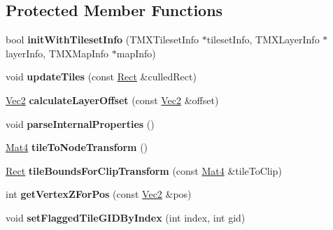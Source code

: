 \subsection*{Protected Member Functions}
\begin{DoxyCompactItemize}
\item 
\mbox{\label{classexperimental_1_1TMXLayer_abc5373b13dff0e9f01697f46783eaff8}} 
bool {\bfseries init\+With\+Tileset\+Info} (T\+M\+X\+Tileset\+Info $\ast$tileset\+Info, T\+M\+X\+Layer\+Info $\ast$layer\+Info, T\+M\+X\+Map\+Info $\ast$map\+Info)
\item 
\mbox{\label{classexperimental_1_1TMXLayer_a905d1bd7651df39c2b80a5aaf5a79b16}} 
void {\bfseries update\+Tiles} (const \hyperlink{classRect}{Rect} \&culled\+Rect)
\item 
\mbox{\label{classexperimental_1_1TMXLayer_a429b05f5840cdebf4591a93ae3571068}} 
\hyperlink{classVec2}{Vec2} {\bfseries calculate\+Layer\+Offset} (const \hyperlink{classVec2}{Vec2} \&offset)
\item 
\mbox{\label{classexperimental_1_1TMXLayer_a971029e08d5cb9d854c68134c81f1c98}} 
void {\bfseries parse\+Internal\+Properties} ()
\item 
\mbox{\label{classexperimental_1_1TMXLayer_a9f7a77efec0bf9e3917b7a0b29d86a13}} 
\hyperlink{classMat4}{Mat4} {\bfseries tile\+To\+Node\+Transform} ()
\item 
\mbox{\label{classexperimental_1_1TMXLayer_ab82e01b8bd35bf9bb395b48a188a2dfb}} 
\hyperlink{classRect}{Rect} {\bfseries tile\+Bounds\+For\+Clip\+Transform} (const \hyperlink{classMat4}{Mat4} \&tile\+To\+Clip)
\item 
\mbox{\label{classexperimental_1_1TMXLayer_a43dd1ce85ca7b58d34e6939c9c6d9ca9}} 
int {\bfseries get\+Vertex\+Z\+For\+Pos} (const \hyperlink{classVec2}{Vec2} \&pos)
\item 
\mbox{\label{classexperimental_1_1TMXLayer_a08e8f6da80f7084988f71d44bb7853f7}} 
void {\bfseries set\+Flagged\+Tile\+G\+I\+D\+By\+Index} (int index, int gid)

\end{DoxyCompactItemize}

